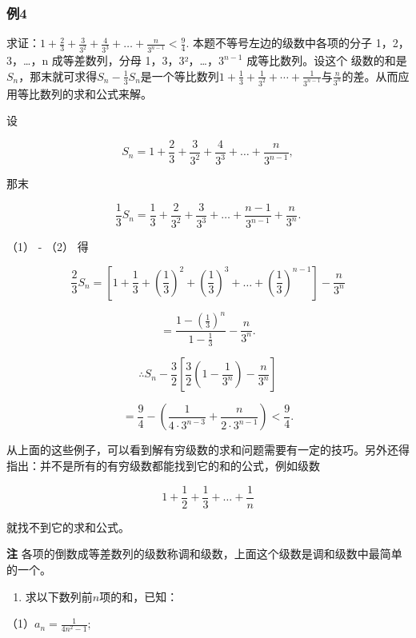 \subsubsection{例4}

求证：\(1 + \frac{2}{3} +\frac{3}{3^2} +\frac{4}{3^3} +\dots +\frac{n}{3^{n - 1}} < \frac{9}{4}.\)
 本题不等号左边的级数中各项的分子 1，2，3，\ldots，n
成等差数列，分母 1，3，3²，\ldots，\(3^{n-1}\) 成等比数列。设这个
级数的和是\(S_{n}\)，那末就可求得\(S_{n} - \frac{1}{3} S_{n}\)是一个等比数列\(1 + \frac{1}{3} + \frac{1}{3^{2}} + \cdots + \frac{1}{3^{n-1}}\)与\(\frac{n}{3^n}\)的差。从而应用等比数列的求和公式来解。

 设

\[
S_{n} = 1 + \frac{2}{3} + \frac{3}{3^{2}} + \frac{4}{3^{3}} + \dots + \frac{n}{3^{n - 1}}, \tag {1}
\]

那末

\[
\frac{1}{3} S_{n} = \frac{1}{3} + \frac{2}{3^{2}} + \frac{3}{3^{3}} + \dots + \frac{n - 1}{3^{n - 1}} + \frac{n}{3^{n}}. \tag {2}
\]

（1） - （2） 得

\[
\frac{2}{3} S_{n} = \left[ 1 + \frac{1}{3} + \left(\frac{1}{3}\right)^{2} + \left(\frac{1}{3}\right)^{3} + \dots + \left(\frac{1}{3}\right)^{n - 1} \right] - \frac{n}{3^{n}}
\]

\[
= \frac{1 - \left(\frac{1}{3}\right)^{n}}{1 - \frac{1}{3}} - \frac{n}{3^{n}}. \tag {3}
\]

\[
\therefore S_{n} - \frac{3}{2} \left[ \frac{3}{2} \left(1 - \frac{1}{3^{n}}\right) - \frac{n}{3^{n}} \right]
\]

\[
= \frac{9}{4} - \left(\frac{1}{4 \cdot 3^{n - 3}} + \frac{n}{2 \cdot 3^{n - 1}}\right) < \frac{9}{4}.
\]

从上面的这些例子，可以看到解有穷级数的求和问题需要有一定的技巧。另外还得指出：并不是所有的有穷级数都能找到它的和的公式，例如级数

\[
1 + \frac{1}{2} + \frac{1}{3} + \dots + \frac{1}{n}
\]

就找不到它的求和公式。

\textbf{注}
各项的倒数成等差数列的级数称调和级数，上面这个级数是调和级数中最简单的一个。

\begin{enumerate}
\item
  求以下数列前\(n\)项的和，已知：
\end{enumerate}

（1）\(a_{n} = \frac{1}{4n^{2} - 1};\)

